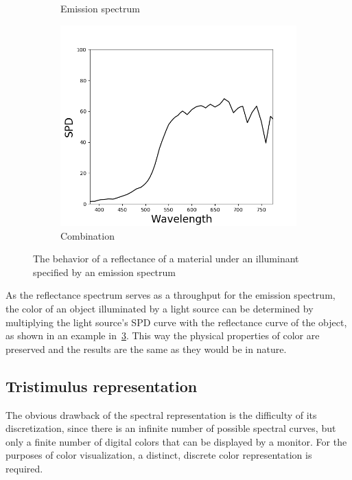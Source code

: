 \begin{figure}[t]
\begin{subfigure}[t]{0.31\textwidth}
	\caption{Emission spectrum}
	\label{fig:spectralRepres_illuminant}
	\end{subfigure}
	\begin{subfigure}[t]{0.31\textwidth}
	\captionsetup{justification=centering}
	\includegraphics[width=\linewidth]{img/spectralRepres_combination.png}
	\caption{Combination}
	\label{fig:spectralRepres_combination}
	\end{subfigure}
	\caption{The behavior of a reflectance of a material under an illuminant specified by an emission spectrum}
	\label{fig:spectralRepresExamples}
\end{figure}

As the reflectance spectrum serves as a throughput for the emission spectrum, the color of an object illuminated by a light source can be determined by multiplying the light source's SPD curve with the reflectance curve of the object, as shown in an example in~\cref{fig:spectralRepresExamples}. This way the physical properties of color are preserved and the results are the same as they would be in nature.

\subsection{Tristimulus representation} \label{ssec:tristimulusRepres}

The obvious drawback of the spectral representation is the difficulty of its discretization, since there is an infinite number of possible spectral curves, but only a finite number of digital colors that can be displayed by a monitor. For the purposes of color visualization, a distinct, discrete color
representation is required. 

